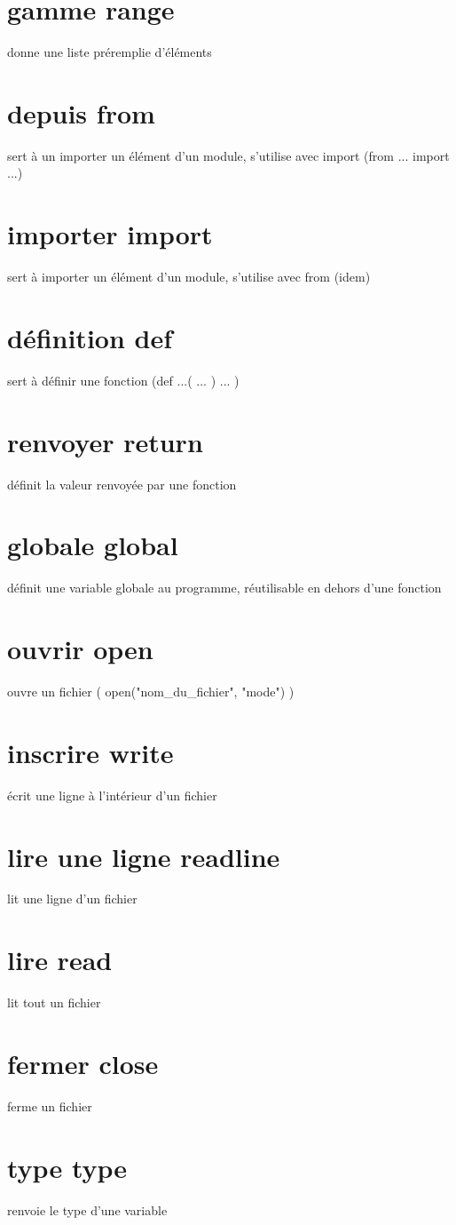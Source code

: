 \documentclass{book}
\begin{document}
\section{gamme range }
  donne une liste préremplie d'éléments
\section{depuis from }
  sert à un importer un élément d'un module, s'utilise avec import (from ... import ...)
\section{importer import }
  sert à importer un élément d'un module, s'utilise avec from (idem)
\section{définition def }
  sert à définir une fonction (def ...( ... ) { ... })
\section{renvoyer return }
  définit la valeur renvoyée par une fonction
\section{globale global }
  définit une variable globale au programme, réutilisable en dehors d'une fonction
\section{ouvrir open }
  ouvre un fichier ( open("nom\_du\_fichier", "mode") )
\section{inscrire write }
  écrit une ligne à l'intérieur d'un fichier
\section{lire une ligne readline }
  lit une ligne d'un fichier
\section{lire read }
  lit tout un fichier
\section{fermer close }
  ferme un fichier
\section{type type }
  renvoie le type d'une variable
\end{document}
